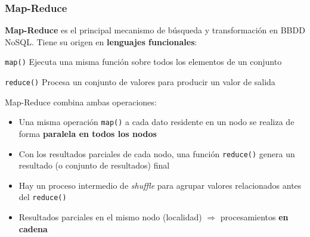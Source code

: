 \documentclass[14pt]{beamer}
\begin{document}


\begin{frame}
\frametitle{Map-Reduce}

 {\bf Map-Reduce} es el principal mecanismo de búsqueda y transformación en
 BBDD NoSQL. Tiene su origen en {\bf lenguajes funcionales}:
  \begin{block}{{\tt map()}}
    Ejecuta una misma función sobre todos los elementos de un conjunto
  \end{block}
  \begin{block}{{\tt reduce()}}
    Procesa un conjunto de valores para producir un valor de salida
  \end{block}

\framebreak

Map-Reduce combina ambas operaciones:
\begin{itemize}
\item Una misma operación {\tt map()} a cada dato residente en un nodo se
  realiza de forma {\bf paralela en todos los nodos}
\item Con los resultados parciales de cada nodo, una función {\tt reduce()}
  genera un resultado (o conjunto de resultados) final
\item Hay un proceso intermedio de {\em shuffle} para agrupar valores
  relacionados antes del {\tt reduce()}
\item Resultados parciales en el mismo nodo (localidad) $\Rightarrow$
  procesamientos {\bf en cadena}
\end{itemize}

\end{frame}
\end{document}
